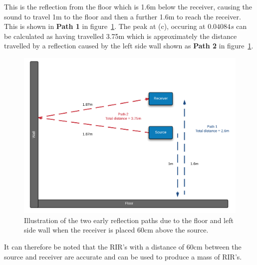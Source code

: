 \documentclass[../../main.tex]{subfiles}
\begin{document}
			This is the reflection from the floor which is 1.6m below the receiver, causing the sound to travel 1m to the floor and then a further 1.6m to reach the receiver. This is shown in \textbf{Path 1} in figure~\ref{reflectionPaths}. The peak at (c), occuring at $0.04084s$ can be calculated as having travelled 3.75m which is approximately the distance travelled by a reflection caused by the left side wall shown as \textbf{Path 2} in figure~\ref{reflectionPaths}.

			\begin{figure}[H]
			\centerline{\includegraphics[scale = 0.25]{Sections/Implementation/Odeon/images/incorrectRIR/reflectionPaths_colourV1.png}}
				\caption{Illustration of the two early reflection paths due to the floor and left side wall when the receiver is placed 60cm above the source.}
				\label{reflectionPaths}
			\end{figure}

			It can therefore be noted that the \ac{RIR}'s with a distance of 60cm between the source and receiver are accurate and can be used to produce a mass of \ac{RIR}'s.
\end{document}

